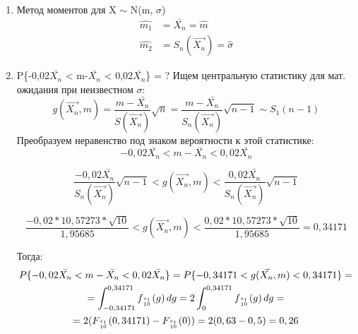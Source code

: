\begin{enumerate}
	\item Метод моментов для X \(\sim\) N(m, \(\sigma\))
	\begin{align*} 
		\widehat{m_1} &= \bar{X_n} = \widehat{m} \\
		\widehat{m_2} &= S_n(\vec{X_n}) = \widehat{\sigma}
	\end{align*}

	\item P\{-0,02\(\bar{X_n}\) < m-\(\bar{X_n}\) < 0,02\(\bar{X_n}\)\} = ?
	Ищем центральную статистику для мат. ожидания при неизвестном \(\sigma\):
	\begin{equation*} 
		g(\vec{X_n}, m) = \frac{m-\bar{X_n}}{S(\vec{X_n})}\sqrt{n} = 
		\frac{m-\bar{X_n}}{S_n(\vec{X_n})}\sqrt{n-1}
		\sim
		S_1(n-1)
	\end{equation*}
	Преобразуем неравенство под знаком вероятности к этой статистике: \\

	\begin{equation*}
	-0,02\bar{X_n} < m-\bar{X_n} < 0,02\bar{X_n}
	\end{equation*}	

	\begin{equation*}
		\frac{-0,02\bar{X_n}}{S_n(\vec{X_n})}\sqrt{n-1}
		<
		g(\vec{X_n}, m)
		<
		\frac{0,02\bar{X_n}}{S_n(\vec{X_n})}\sqrt{n-1}
	\end{equation*}	

	\begin{equation*}
		\frac{-0,02 * 10,57273 * \sqrt{10} }{1,95685}
		<
		g(\vec{X_n}, m)
		<
		\frac{0,02 * 10,57273 * \sqrt{10} }{1,95685}
		=
		0,34171
	\end{equation*}

	Тогда: \\

	\begin{gather*}
	P\{-0,02\bar{X_n} < m-\bar{X_n} < 0,02\bar{X_n}\} = P\{-0,34171 < g(\vec{X_n}, m) < 0,34171\} = \\
	= \int^{0,34171}_{-0,34171} f_{s_1\atop10}(g)\,dg 
	= 2\int^{0,34171}_{0} f_{s_1\atop10}(g)\,dg = \\
	= 2(F_{s_1\atop10}(0,34171) - F_{s_1\atop10}(0)) 
	= 2(0,63 - 0,5)
	= 0,26
	\end{gather*}

\end{enumerate}

